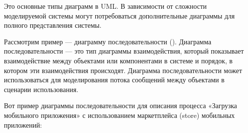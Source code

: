 \documentclass[letterpaper,10pt,russian]{sphinxmanual}
\begin{document}
\sphinxAtStartPar
Это основные типы диаграмм в UML. В зависимости от сложности моделируемой системы могут потребоваться дополнительные диаграммы для полного представления системы.

\sphinxAtStartPar
Рассмотрим пример — диаграмму последовательности ().
Диаграмма последовательности  — это тип диаграммы взаимодействия, который показывает взаимодействие между объектами или компонентами в системе и порядок, в котором эти взаимодействия происходят. Диаграмма последовательности может использоваться для моделирования потока сообщений между объектами в сценарии использования.

\sphinxAtStartPar
Вот пример диаграммы последовательности для описания процесса «Загрузка мобильного приложения» с использованием маркетплейса (store) мобильных приложений:

\begin{sphinxVerbatim}[commandchars=\\\{\}]
 
   
   
   
  
   
   
   
   
  
  
   
   
 
 
\end{sphinxVerbatim}
\end{document}
